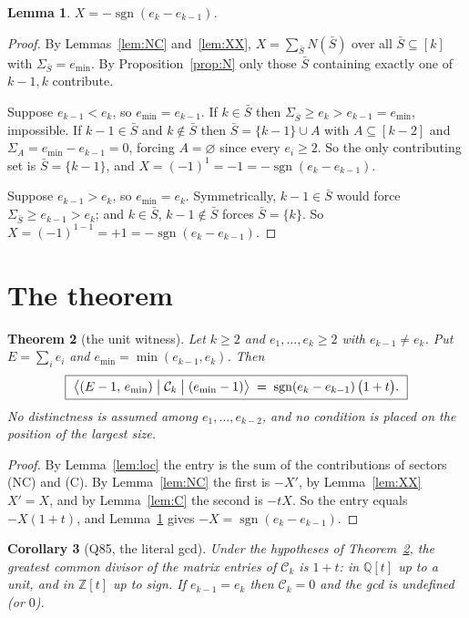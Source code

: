 \documentclass[11pt]{article}
\newtheorem{theorem}{Theorem}
\newtheorem{lemma}[theorem]{Lemma}
\newtheorem{corollary}[theorem]{Corollary}
\theoremstyle{definition}
\newcommand{\Ck}{\mathcal{C}}
\newcommand{\Z}{\mathbb{Z}}
\newcommand{\Q}{\mathbb{Q}}
\DeclareMathOperator{\sgn}{sgn}
\begin{document}
\begin{lemma}\label{lem:X}
$X=-\sgn(e_k-e_{k-1})$.
\end{lemma}

\begin{proof}
By Lemmas~\ref{lem:NC} and~\ref{lem:XX}, $X=\sum_{\bar S}N(\bar S)$ over all
$\bar S\subseteq[k]$ with $\Sigma_{\bar S}=e_{\min}$.  By Proposition~\ref{prop:N} only
those $\bar S$ containing exactly one of $k-1,k$ contribute.

Suppose $e_{k-1}<e_k$, so $e_{\min}=e_{k-1}$.  If $k\in\bar S$ then
$\Sigma_{\bar S}\ge e_k>e_{k-1}=e_{\min}$, impossible.  If $k-1\in\bar S$ and
$k\notin\bar S$ then $\bar S=\{k-1\}\cup A$ with $A\subseteq[k-2]$ and
$\Sigma_A=e_{\min}-e_{k-1}=0$, forcing $A=\varnothing$ since every $e_i\ge2$.  So the only
contributing set is $\bar S=\{k-1\}$, and $X=(-1)^{1}=-1=-\sgn(e_k-e_{k-1})$.

Suppose $e_{k-1}>e_k$, so $e_{\min}=e_k$.  Symmetrically, $k-1\in\bar S$ would force
$\Sigma_{\bar S}\ge e_{k-1}>e_k$; and $k\in\bar S$, $k-1\notin\bar S$ forces
$\bar S=\{k\}$.  So $X=(-1)^{1-1}=+1=-\sgn(e_k-e_{k-1})$.
\end{proof}

\section{The theorem}

\begin{theorem}[the unit witness]\label{thm:main}
Let $k\ge2$ and $e_1,\dots,e_k\ge2$ with $e_{k-1}\ne e_k$.  Put $E=\sum_ie_i$ and
$e_{\min}=\min(e_{k-1},e_k)$.  Then
\[
  \boxed{\ \bigl\langle (E-1,\,e_{\min})\bigm|\Ck_k\bigm|(e_{\min}-1)\bigr\rangle
  \;=\;\sgn(e_k-e_{k-1})\,\bigl(1+t\bigr).\ }
\]
No distinctness is assumed among $e_1,\dots,e_{k-2}$, and no condition is placed on the
position of the largest size.
\end{theorem}

\begin{proof}
By Lemma~\ref{lem:loc} the entry is the sum of the contributions of sectors (NC) and (C).
By Lemma~\ref{lem:NC} the first is $-X'$, by Lemma~\ref{lem:XX} $X'=X$, and by
Lemma~\ref{lem:C} the second is $-tX$.  So the entry equals $-X(1+t)$, and
Lemma~\ref{lem:X} gives $-X=\sgn(e_k-e_{k-1})$.
\end{proof}

\begin{corollary}[Q85, the literal gcd]\label{cor:gcd}
Under the hypotheses of Theorem~\ref{thm:main}, the greatest common divisor of the matrix
entries of $\Ck_k$ is $1+t$: in $\Q[t]$ up to a unit, and in $\Z[t]$ up to sign.  If
$e_{k-1}=e_k$ then $\Ck_k=0$ and the gcd is undefined (or $0$).
\end{corollary}
\end{document}
